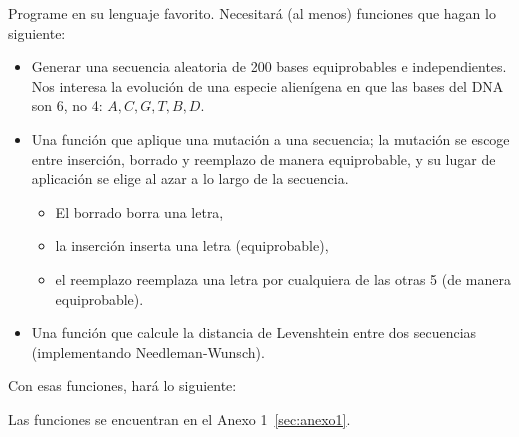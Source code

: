 Programe en su lenguaje favorito.
Necesitará (al menos) funciones que hagan lo siguiente:
\begin{itemize}
	\item Generar una secuencia aleatoria de 200 bases
		equiprobables e independientes.
		Nos interesa la evolución de una especie alienígena
		en que las bases del DNA son 6, no 4: $A,C,G,T,B,D$.

	\item Una función que aplique una mutación a una secuencia;
		la mutación se escoge entre inserción, borrado y reemplazo
		de manera equiprobable, y su lugar de aplicación se elige
		al azar a lo largo de la secuencia.

		\begin{itemize}
			\item El borrado borra una letra,
			\item la inserción inserta una letra (equiprobable),
			\item el reemplazo reemplaza una letra por cualquiera
				de las otras 5 (de manera equiprobable).
		\end{itemize}

	\item Una función que calcule la distancia de Levenshtein
		entre dos secuencias (implementando Needleman-Wunsch).
\end{itemize}

Con esas funciones, hará lo siguiente:

 Las funciones se encuentran en el Anexo 1~\ref{sec:anexo1}.

